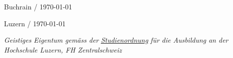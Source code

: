 \vspace{1.75em}

Buchrain  / \today       \hrulefill

\vspace{2em}

Luzern    /  \today      \hrulefill

\vspace{2em}

\textit{Geistiges Eigentum gemäss der }\href{https://srl.lu.ch/app/de/texts_of_law/521/versions/3884}{\underline{\textit{Studienordnung}}}\textit{ für die Ausbildung an der Hochschule Luzern, FH Zentralschweiz}